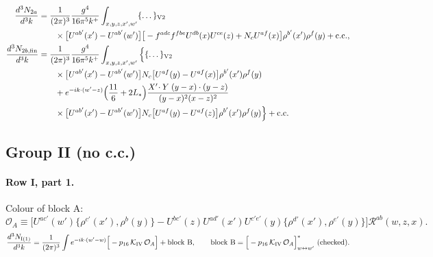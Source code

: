 \documentclass[10pt]{article}
\numberwithin{equation}{section}
\newcommand{\Ls}{L_{*}}
\newcommand{\Rc}{\mathcal R}
\newcommand{\OO}{\mathcal O}
\newcommand{\KK}{\mathcal K}
\newcommand{\pre}{\frac{1}{(2\pi)^3}}
\newcommand{\phw}{e^{-ik\cdot(w'-w)}}
\begin{document}
\begin{align}
\frac{d^3N_{2a}}{d^3k}&=\pre\frac{g^4}{16\pi^5k^+}\int_{x,y,z,x',w'}\{\dots\}_{\rm V2}\notag\\&\qquad\times\big[U^{ab'}(x')-U^{ab'}(w')\big]\big[-f^{adc}f^{fbe}U^{db}(x)U^{ce}(z)+N_cU^{af}(x)\big]\rho^{b'}(x')\rho^f(y)+{\rm c.c.},\label{eq:V2a}\\
\frac{d^3N_{2b,\rm fin}}{d^3k}&=\pre\frac{g^4}{16\pi^5k^+}\int_{x,y,z,x',w'}\Big\{\{\dots\}_{\rm V2}\notag\\&\qquad\times\big[U^{ab'}(x')-U^{ab'}(w')\big]N_c\big[U^{af}(y)-U^{af}(x)\big]\rho^{b'}(x')\rho^f(y)\notag\\
&\qquad+e^{-ik\cdot(w'-z)}\Big(\frac{11}{6}+2\Ls\Big)\frac{X'\!\cdot Y\;(y-x)\cdot(y-z)}{(y-x)^2(x-z)^2}\notag\\&\qquad\times\big[U^{ab'}(x')-U^{ab'}(w')\big]N_c\big[U^{af}(y)-U^{af}(z)\big]\rho^{b'}(x')\rho^f(y)\Big\}+{\rm c.c.}\label{eq:V2b}
\end{align}

\subsection{Group II (no c.c.)}
\paragraph{Row I, part 1.} Colour of block A:
\begin{equation*}
\OO_A\equiv\big[U^{ac'}(w')\{\rho^{c'}(x'),\rho^b(y)\}-U^{bc'}(z)U^{ad'}(x')U^{c'e'}(y)\{\rho^{d'}(x'),\rho^{e'}(y)\}\big]\Rc^{ab}(w,z,x).
\end{equation*}
\begin{equation}
\frac{d^3N_{\rm I(1)}}{d^3k}=\pre\int\phw\Big[-p_{16}\,\KK_{\rm IV}\,\OO_A\Big]+\text{block B},\qquad\text{block B}=\Big[-p_{16}\,\KK_{\rm IV}\,\OO_A\Big]^*_{w\leftrightarrow w'}\ \text{(checked)}.
\label{eq:G2I1}
\end{equation}
\end{document}
